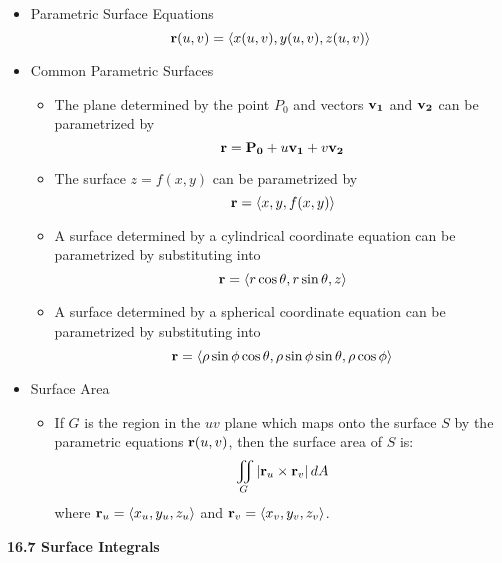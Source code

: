   \begin{itemize}

    \item Parametric Surface Equations
      \[
        \mathbf{r}(u,v) = \left<x(u,v),y(u,v),z(u,v)\right>
      \]

    \item Common Parametric Surfaces
      \begin{itemize}
        \item The plane determined by the point $P_0$ and vectors $\mathbf{v_1}$ and $\mathbf{v_2}$ can be parametrized by
          \[
            \mathbf{r} = \mathbf{P_0}+u\mathbf{v_1}+v\mathbf{v_2}
          \]
        \item The surface $z=f(x,y)$ can be parametrized by
          \[
            \mathbf{r} = \left<x,y,f(x,y)\right>
          \]
        \item A surface determined by a cylindrical coordinate equation can be parametrized by substituting into
          \[
            \mathbf{r} = \left<r\cos\theta, r\sin\theta, z\right>
          \]
        \item A surface determined by a spherical coordinate equation can be parametrized by substituting into
          \[
            \mathbf{r} = \left<\rho\sin\phi\cos\theta, \rho\sin\phi\sin\theta, \rho\cos\phi \right>
          \]
      \end{itemize}

    \item Surface Area
      \begin{itemize}
        \item If $G$ is the region in the $uv$ plane which maps onto the surface $S$ by the parametric equations $\mathbf{r}(u,v)$, then the surface area of $S$ is:
          \[
            \iint_G |\mathbf{r}_u\times\mathbf{r}_v|\,d{A}
          \]
        where $\mathbf{r}_u=\left<x_u,y_u,z_u\right>$ and $\mathbf{r}_v=\left<x_v,y_v,z_v\right>$.
      \end{itemize}

  \end{itemize}

\newpage

\centerline{\bf 16.7 Surface Integrals}


